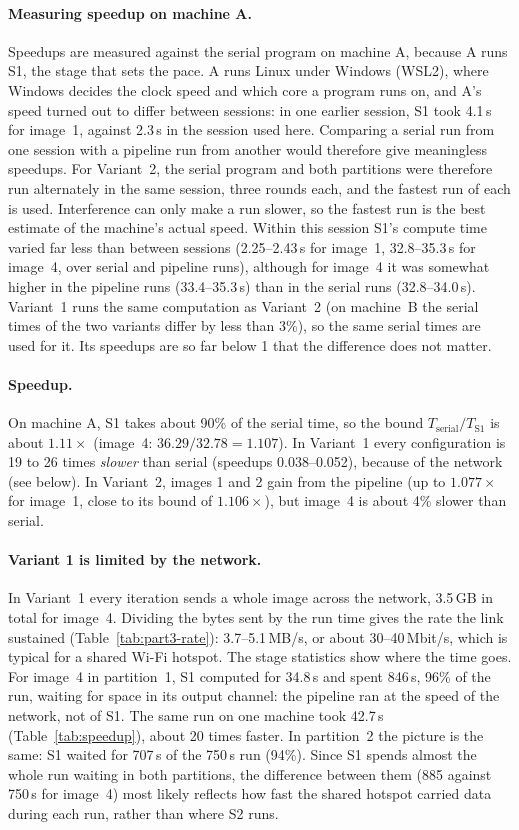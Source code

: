 \documentclass[11pt,a4paper]{article}
\begin{document}
\paragraph{Measuring speedup on machine A.} Speedups are measured against the serial program on
machine A, because A runs S1, the stage that sets the pace. A runs Linux under Windows (WSL2),
where Windows decides the clock speed and which core a program runs on, and A's speed turned out
to differ between sessions: in one earlier session, S1 took 4.1\,s for image~1, against 2.3\,s in
the session used here. Comparing a serial run from one session with a pipeline run from another
would therefore give meaningless speedups. For Variant~2, the serial program and both partitions
were therefore run alternately in the same session, three rounds each, and the fastest run of
each is used. Interference can only make a run slower, so the fastest run is the best estimate of
the machine's actual speed. Within this session S1's compute time varied far less than between
sessions (2.25--2.43\,s for image~1, 32.8--35.3\,s for image~4, over serial and pipeline runs),
although for image~4 it was somewhat higher in the pipeline runs (33.4--35.3\,s) than in the
serial runs (32.8--34.0\,s). Variant~1 runs the same
computation as Variant~2 (on machine~B the serial times of the two variants differ by less than
3\%), so the same serial times are used for it. Its speedups are so far below 1 that the
difference does not matter.

\paragraph{Speedup.} On machine A, S1 takes about 90\% of the serial time, so the bound
$T_\text{serial}/T_\text{S1}$ is about $1.11\times$ (image~4: $36.29/32.78 = 1.107$). In
Variant~1 every configuration is 19 to 26 times \emph{slower} than serial (speedups
0.038--0.052), because of the network (see below). In Variant~2, images 1 and 2 gain from the
pipeline (up to $1.077\times$ for image~1, close to its bound of $1.106\times$), but image~4 is
about 4\% slower than serial.

\paragraph{Variant 1 is limited by the network.} In Variant~1 every iteration sends a whole image
across the network, 3.5\,GB in total for image~4. Dividing the bytes sent by the run time gives the
rate the link sustained (Table~\ref{tab:part3-rate}): 3.7--5.1\,MB/s, or about 30--40\,Mbit/s,
which is typical for a shared Wi-Fi hotspot. The stage statistics show where the time goes. For
image~4 in partition~1, S1 computed for 34.8\,s and spent 846\,s, 96\% of the run, waiting for
space in its output channel: the pipeline ran at the speed of the network, not of S1. The same
run on one machine took 42.7\,s (Table~\ref{tab:speedup}), about 20 times faster. In
partition~2 the picture is the same: S1 waited for 707\,s of the 750\,s run (94\%). Since S1
spends almost the whole run waiting in both partitions, the difference between them (885 against
750\,s for image~4) most likely reflects how fast the shared hotspot carried data during each run,
rather than where S2 runs.
\end{document}
